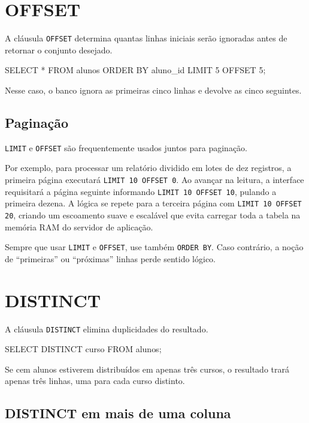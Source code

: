 \section{OFFSET}

A cláusula \texttt{OFFSET} determina quantas linhas iniciais serão ignoradas antes de retornar o conjunto desejado.

\begin{sqlcode}
SELECT *
FROM alunos
ORDER BY aluno_id
LIMIT 5 OFFSET 5;
\end{sqlcode}

Nesse caso, o banco ignora as primeiras cinco linhas e devolve as cinco seguintes.

\subsection{Paginação}

\texttt{LIMIT} e \texttt{OFFSET} são frequentemente usados juntos para paginação.

Por exemplo, para processar um relatório dividido em lotes de dez registros, a primeira página executará \texttt{LIMIT 10 OFFSET 0}. Ao avançar na leitura, a interface requisitará a página seguinte informando \texttt{LIMIT 10 OFFSET 10}, pulando a primeira dezena. A lógica se repete para a terceira página com \texttt{LIMIT 10 OFFSET 20}, criando um escoamento suave e escalável que evita carregar toda a tabela na memória RAM do servidor de aplicação.

\begin{quadro_dica}
Sempre que usar \texttt{LIMIT} e \texttt{OFFSET}, use também \texttt{ORDER BY}. Caso contrário, a noção de “primeiras” ou “próximas” linhas perde sentido lógico.
\end{quadro_dica}

\section{DISTINCT}

A cláusula \texttt{DISTINCT} elimina duplicidades do resultado.

\begin{sqlcode}
SELECT DISTINCT curso
FROM alunos;
\end{sqlcode}

Se cem alunos estiverem distribuídos em apenas três cursos, o resultado trará apenas três linhas, uma para cada curso distinto.

\subsection{DISTINCT em mais de uma coluna}

